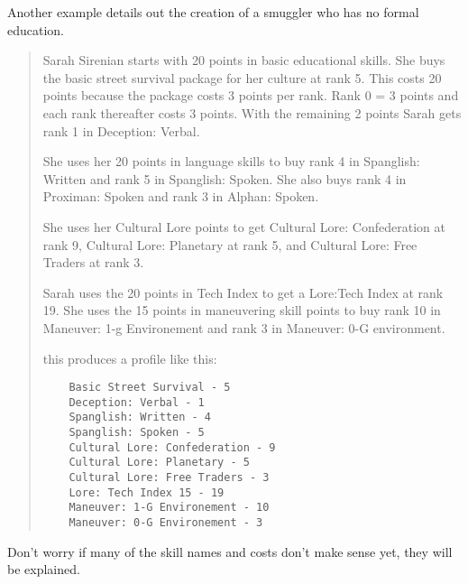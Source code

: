Another example details out the creation of a smuggler who has no 
formal education.

\begin{quotation}

Sarah Sirenian starts with 20 points in basic 
educational skills. She buys the basic street survival package for 
her culture at rank 5. This costs 20 points because the package 
costs 3 points per rank. Rank 0 = 3 points and each rank thereafter 
costs 3 points. With the remaining 2 points Sarah gets rank 1 in 
Deception: Verbal. 

She uses her 20 points in language skills to buy rank 4 in 
Spanglish: Written and rank 5 in Spanglish: Spoken. She also buys 
rank 4 in Proximan: Spoken and rank 3 in Alphan: Spoken.

She uses her Cultural Lore points to get Cultural Lore: Confederation at rank 9,
Cultural Lore: Planetary at rank 5, and Cultural Lore: Free Traders at rank 3.

Sarah uses the 20 points in Tech Index to get a
Lore:Tech Index at rank 19. She uses the 15 points in maneuvering 
skill points to buy rank 10 in Maneuver: 1-g Environement and rank 3
in Maneuver: 0-G environment. 

this produces a profile like this:
	
    \begin{verbatim}
	Basic Street Survival - 5	
	Deception: Verbal - 1
	Spanglish: Written - 4
	Spanglish: Spoken - 5
	Cultural Lore: Confederation - 9
    Cultural Lore: Planetary - 5
    Cultural Lore: Free Traders - 3
	Lore: Tech Index 15 - 19
    Maneuver: 1-G Environement - 10
    Maneuver: 0-G Environement - 3
	\end{verbatim}

\end{quotation}

Don't worry if many of the skill names and costs don't make sense 
yet, they will be explained.

